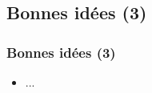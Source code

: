\documentclass[slidetop,11pt]{beamer}
\begin{document}
\subsection{Bonnes id{\'e}es (3)}
\begin{frame}
	\frametitle{Bonnes id{\'e}es (3)}
	\begin{itemize}
		\item ... 
	\end{itemize} 
\end{frame}

\end{document}
